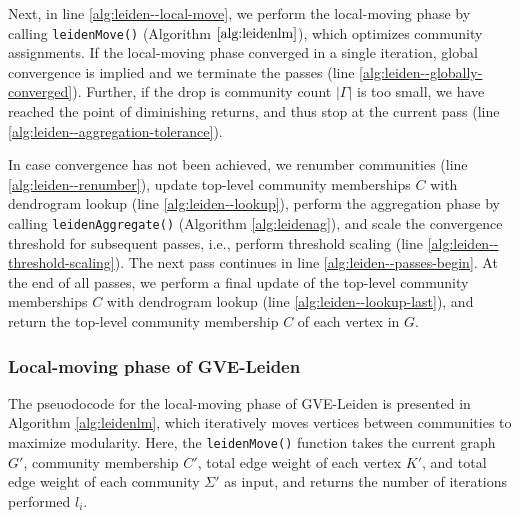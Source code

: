 Next, in line \ref{alg:leiden--local-move}, we perform the local-moving phase by calling \texttt{leidenMove()} (Algorithm $\ref{alg:leidenlm}$), which optimizes community assignments. If the local-moving phase converged in a single iteration, global convergence is implied and we terminate the passes (line \ref{alg:leiden--globally-converged}). Further, if the drop is community count $|\Gamma|$ is too small, we have reached the point of diminishing returns, and thus stop at the current pass (line \ref{alg:leiden--aggregation-tolerance}).

In case convergence has not been achieved, we renumber communities (line \ref{alg:leiden--renumber}), update top-level community memberships $C$ with dendrogram lookup (line \ref{alg:leiden--lookup}), perform the aggregation phase by calling \texttt{leidenAggregate()} (Algorithm \ref{alg:leidenag}), and scale the convergence threshold for subsequent passes, i.e., perform threshold scaling (line \ref{alg:leiden--threshold-scaling}). The next pass continues in line \ref{alg:leiden--passes-begin}. At the end of all passes, we perform a final update of the top-level community memberships $C$ with dendrogram lookup (line \ref{alg:leiden--lookup-last}), and return the top-level community membership $C$ of each vertex in $G$.








\subsubsection{Local-moving phase of GVE-Leiden}

The pseuodocode for the local-moving phase of GVE-Leiden is presented in Algorithm \ref{alg:leidenlm}, which iteratively moves vertices between communities to maximize modularity. Here, the \texttt{leidenMove()} function takes the current graph $G'$, community membership $C'$, total edge weight of each vertex $K'$, and total edge weight of each community $\Sigma'$ as input, and returns the number of iterations performed $l_i$.

